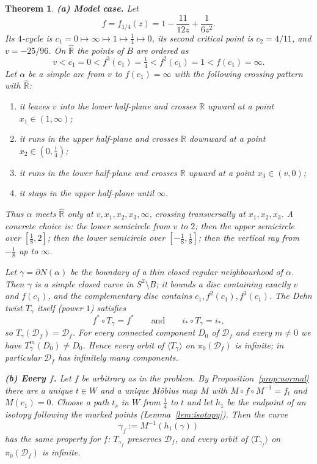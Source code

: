 \documentclass[11pt]{article}
\newtheorem{theorem}{Theorem}
\theoremstyle{definition}
\newcommand{\Rh}{\hat{\mathbb R}}
\newcommand{\D}{\mathcal D}
\begin{document}
\begin{theorem}\label{thm:main}
\textbf{(a) Model case.} Let
\[f=f_{1/4}(z)=1-\frac{11}{12z}+\frac1{6z^2}.\]
Its $4$-cycle is $c_1=0\mapsto\infty\mapsto1\mapsto\tfrac14\mapsto0$, 
its second critical point is $c_2=4/11$, and $v=-25/96$. On $\Rh$ the points of $B$ are ordered as
\[v<c_1=0<f^{3}(c_1)=\tfrac14<f^{2}(c_1)=1<f(c_1)=\infty .\]
Let $\alpha$ be a simple arc from $v$ to $f(c_1)=\infty$ with the following crossing pattern with $\Rh$:
\begin{enumerate}[label=\textup{(\arabic*)}]
\item it leaves $v$ into the lower half-plane and crosses $\mathbb R$ upward at a point $x_1\in(1,\infty)$;
\item it runs in the upper half-plane and crosses $\mathbb R$ downward at a point $x_2\in(0,\tfrac14)$;
\item it runs in the lower half-plane and crosses $\mathbb R$ upward at a point $x_3\in(v,0)$;
\item it stays in the upper half-plane until $\infty$.
\end{enumerate}
Thus $\alpha$ meets $\Rh$ only at $v,x_1,x_2,x_3,\infty$, crossing transversally at $x_1,x_2,x_3$. A concrete choice is: the lower semicircle from $v$ to $2$; then the upper semicircle over $[\tfrac18,2]$; then the lower semicircle over $[-\tfrac18,\tfrac18]$; then the vertical ray from $-\tfrac18$ up to $\infty$.

Let $\gamma=\partial N(\alpha)$ be the boundary of a thin closed regular neighbourhood of $\alpha$. Then $\gamma$ is a simple closed curve in $S^2\setminus B$; it bounds a disc containing exactly $v$ and $f(c_1)$, and the complementary disc contains $c_1,f^2(c_1),f^3(c_1)$. The Dehn twist $T_\gamma$ itself (power $1$) satisfies
\[f^*\circ T_\gamma=f^*\qquad\text{and}\qquad i_*\circ T_\gamma=i_*,\]
so $T_\gamma(\D_f)=\D_f$. For every connected component $D_0$ of $\D_f$ and every $m\ne0$ we have $T_\gamma^m(D_0)\ne D_0$. Hence every orbit of $\langle T_\gamma\rangle$ on $\pi_0(\D_f)$ is infinite; in particular $\D_f$ has infinitely many components.

\smallskip
\textbf{(b) Every $f$.} Let $f$ be arbitrary as in the problem. By Proposition~\ref{prop:normal} there are a unique $t\in W$ and a unique M\"obius map $M$ with $M\circ f\circ M^{-1}=f_t$ and $M(c_1)=0$. Choose a path $t_s$ in $W$ from $\tfrac14$ to $t$ and let $h_1$ be the endpoint of an isotopy following the marked points (Lemma~\ref{lem:isotopy}). Then the curve
\[\gamma_f:=M^{-1}(h_1(\gamma))\]
has the same property for $f$: $T_{\gamma_f}$ preserves $\D_f$, and every orbit of $\langle T_{\gamma_f}\rangle$ on $\pi_0(\D_f)$ is infinite.


\end{theorem}
\end{document}
